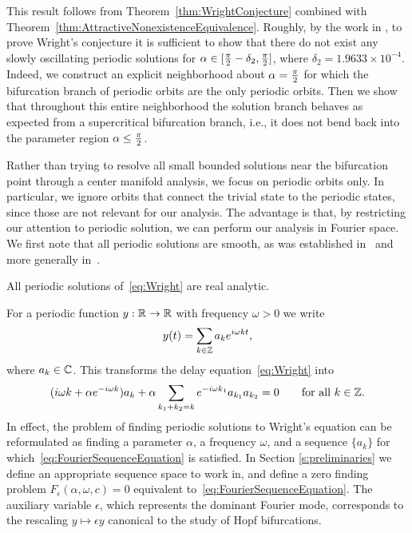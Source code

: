 This result follows from Theorem~\ref{thm:WrightConjecture} combined with Theorem~\ref{thm:AttractiveNonexistenceEquivalence}. 
Roughly, by the work in \cite{neumaier2014global}, 
to prove Wright's conjecture
it is sufficient  to show that there do not exist any slowly oscillating periodic solutions for $ \alpha \in [ \tfrac{\pi}{2} - \delta_2, \tfrac{\pi}{2}]$, where $\delta_2 = 1.9633 \times 10^{-4}$.
Indeed, we construct an explicit neighborhood about $ \alpha = \tfrac{\pi}{2}$ for which the bifurcation branch of periodic orbits are the only periodic orbits. 
Then we show that throughout this entire neighborhood the solution branch behaves as expected from a supercritical bifurcation branch, i.e., it does not bend back into the parameter region $\alpha \leq \tfrac{\pi}{2}$.


Rather than trying to resolve all small bounded solutions near the bifurcation point through a center manifold analysis, we focus on periodic orbits only. In particular, we ignore orbits that connect the trivial state to the periodic states, since those are not relevant for our analysis.
The advantage is that, by restricting our attention to periodic solution, we can perform our analysis in Fourier space. We first note that all periodic solutions are smooth, as was established in~\cite{wright1955non} and more generally in~\cite{nussbaum-analytic}.
\begin{lemma}\label{l:analytic}
	All periodic solutions of~\eqref{eq:Wright} are real analytic.
\end{lemma}

For  a periodic function $y:\mathbb{R} \to \mathbb{R}$ with frequency $\omega >0$ we write 
\begin{equation}
y(t)  = \sum_{k \in \mathbb{Z}} a_{k} e^{ i \omega k t } ,
\label{eq:FourierEquation}
\end{equation}
where $a_k \in \mathbb{C}$. 
This transforms the delay equation~\eqref{eq:Wright} into 
\begin{equation}
( i \omega k + \alpha e^{ - i \omega k}) a_k + \alpha \sum_{k_1 + k_2 = k} e^{- i \omega k_1} a_{k_1} a_{k_2} = 0 \qquad\text{for all } k \in \mathbb{Z}.
\label{eq:FourierSequenceEquation}
\end{equation}
In effect, the problem of finding periodic solutions to Wright's equation can be reformulated as finding a parameter $ \alpha$, a frequency $\omega$, and a sequence $ \{a_k\}$  for which~\eqref{eq:FourierSequenceEquation} is satisfied. 
In Section \ref{s:preliminaries} we define an appropriate sequence space to work in, and define a zero finding problem $ F_\epsilon( \alpha,\omega,c)=0$  equivalent to~\eqref{eq:FourierSequenceEquation}.  
The auxiliary variable $\epsilon$, which represents the dominant Fourier mode, corresponds to the rescaling $y \mapsto \epsilon y$ canonical to the study of Hopf bifurcations. 




